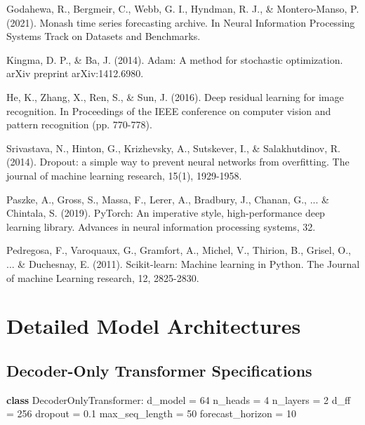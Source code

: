\documentclass[11pt]{article}
\begin{document}
\begin{thebibliography}{99}
Godahewa, R., Bergmeir, C., Webb, G. I., Hyndman, R. J., \& Montero‐Manso, P. (2021). Monash time series forecasting archive. In Neural Information Processing Systems Track on Datasets and Benchmarks.

Kingma, D. P., \& Ba, J. (2014). Adam: A method for stochastic optimization. arXiv preprint arXiv:1412.6980.

He, K., Zhang, X., Ren, S., \& Sun, J. (2016). Deep residual learning for image recognition. In Proceedings of the IEEE conference on computer vision and pattern recognition (pp. 770-778).

Srivastava, N., Hinton, G., Krizhevsky, A., Sutskever, I., \& Salakhutdinov, R. (2014). Dropout: a simple way to prevent neural networks from overfitting. The journal of machine learning research, 15(1), 1929-1958.

Paszke, A., Gross, S., Massa, F., Lerer, A., Bradbury, J., Chanan, G., ... \& Chintala, S. (2019). PyTorch: An imperative style, high-performance deep learning library. Advances in neural information processing systems, 32.

Pedregosa, F., Varoquaux, G., Gramfort, A., Michel, V., Thirion, B., Grisel, O., ... \& Duchesnay, E. (2011). Scikit-learn: Machine learning in Python. The Journal of machine Learning research, 12, 2825-2830.

\end{thebibliography}

\appendix

\section{Detailed Model Architectures}

\subsection{Decoder-Only Transformer Specifications}

\begin{algorithmic}
\STATE \textbf{class} DecoderOnlyTransformer:
\STATE \quad d\_model = 64 
\STATE \quad n\_heads = 4 
\STATE \quad n\_layers = 2 
\STATE \quad d\_ff = 256 
\STATE \quad dropout = 0.1 
\STATE \quad max\_seq\_length = 50 
\STATE \quad forecast\_horizon = 10 
\STATE {}
\end{algorithmic}
\end{document}
